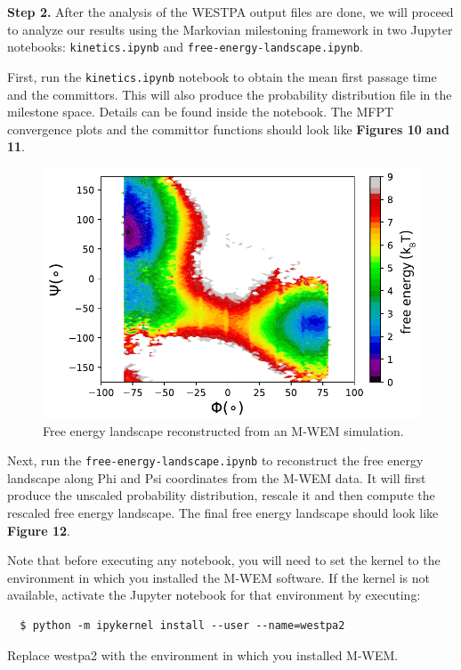 \textbf{Step 2.} After the analysis of the WESTPA output files are done, we will proceed to analyze our results using the Markovian milestoning framework in two Jupyter notebooks: \verb|kinetics.ipynb| and \verb|free-energy-landscape.ipynb|.

First, run the \verb|kinetics.ipynb| notebook to obtain the mean first passage time and the committors. 
This will also produce the probability distribution file in the milestone space. Details can be found inside the notebook. 
The MFPT convergence plots and the committor functions should look like \textbf{Figures 10 and 11}.

\begin{figure}[t]
\centering
\includegraphics[width=\columnwidth]{figures/Figure12_RFree.pdf}
\caption{Free energy landscape reconstructed from an M-WEM simulation.}
\end{figure}

Next, run the \verb|free-energy-landscape.ipynb| to reconstruct the free energy landscape along Phi and Psi coordinates from the M-WEM data. 
It will first produce the unscaled probability distribution, rescale it and then compute the rescaled free energy landscape. 
The final free energy landscape should look like \textbf{Figure 12}.

Note that before executing any notebook, you will need to set the kernel to the environment in which you installed the M-WEM software. 
If the kernel is not available, activate the Jupyter notebook for that environment by executing:

\begin{verbatim}
  $ python -m ipykernel install --user --name=westpa2
\end{verbatim}
Replace westpa2 with the environment in which you installed M-WEM.

